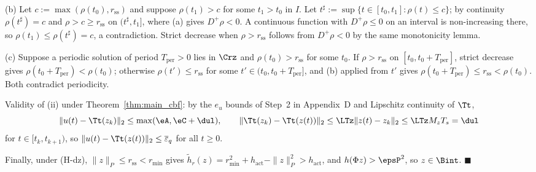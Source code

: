 (b) Let \(c := \max(\rho(t_0), r_{\mathrm{ss}})\) and suppose \(\rho(t_1) > c\) for some \(t_1 > t_0\) in \(I\). Let \(t^\sharp := \sup\{t \in [t_0, t_1] : \rho(t) \le c\}\); by continuity \(\rho(t^\sharp) = c\) and \(\rho > c \ge r_{\mathrm{ss}}\) on \((t^\sharp, t_1]\), where (a) gives \(D^+\rho < 0\). A continuous function with \(D^+\rho \le 0\) on an interval is non-increasing there, so \(\rho(t_1) \le \rho(t^\sharp) = c\), a contradiction. Strict decrease when \(\rho > r_{\mathrm{ss}}\) follows from \(D^+\rho < 0\) by the same monotonicity lemma.

(c) Suppose a periodic solution of period \(T_{\mathrm{per}} > 0\) lies in \(\Crz\) and \(\rho(t_0) > r_{\mathrm{ss}}\) for some \(t_0\). If \(\rho > r_{\mathrm{ss}}\) on \([t_0, t_0 + T_{\mathrm{per}}]\), strict decrease gives \(\rho(t_0 + T_{\mathrm{per}}) < \rho(t_0)\); otherwise \(\rho(t') \le r_{\mathrm{ss}}\) for some \(t' \in (t_0, t_0 + T_{\mathrm{per}}]\), and (b) applied from \(t'\) gives \(\rho(t_0 + T_{\mathrm{per}}) \le r_{\mathrm{ss}} < \rho(t_0)\). Both contradict periodicity.

Validity of (ii) under Theorem~\ref{thm:main_cbf}: by the \(e_u\) bounds of Step~2 in Appendix~D and Lipschitz continuity of \(\Tt\),
\[
\|u(t) - \Tt(z_k)\|_2 \le \max(\eA, \eC + \dul), \qquad \|\Tt(z_k) - \Tt(z(t))\|_2 \le \LTz\|z(t) - z_k\|_2 \le \LTz M_zT_s = \dul
\]
for \(t \in [t_k, t_{k+1})\), so \(\|u(t) - \Tt(z(t))\|_2 \le \overline{\varepsilon}_q\) for all \(t \ge 0\).

Finally, under (H-dz), \(\|z\|_P \le r_{\mathrm{ss}} < r_{\min}\) gives \(\tilde{h}_r(z) = r_{\min}^2 + h_{\mathrm{act}} - \|z\|_P^2 > h_{\mathrm{act}}\), and \(h(\Phi z) > \epsP^2\), so \(z \in \Bint\). \hfill \(\blacksquare\)

